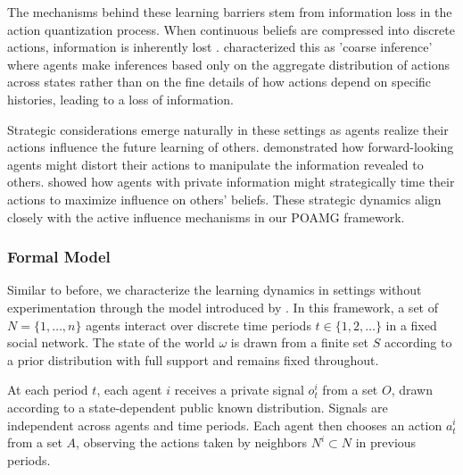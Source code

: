 \documentclass[a4paper,12pt]{report}
\begin{document}
The mechanisms behind these learning barriers stem from information loss in the action quantization process. When continuous beliefs are compressed into discrete actions, information is inherently lost \citep{smith2000pathological}. \citet{guarino2013social} characterized this as 'coarse inference' where agents make inferences based only on the aggregate distribution of actions across states rather than on the fine details of how actions depend on specific histories, leading to a loss of information.

\iffalse
    Recent work has examined how behavioral factors and network structure interact to shape learning outcomes. \citet{molavi2018theory} developed models of "rational inattention" where agents optimally allocate limited cognitive resources to process social information. \citet{dasaratha2020learning} showed how certain network structures can amplify or mitigate the effects of confirmation bias and other cognitive distortions. \citet{jadbabaie2012non} proposed hybrid learning models that combine Bayesian updating with naive opinion averaging, better matching empirical patterns of social influence.
\fi

Strategic considerations emerge naturally in these settings as agents realize their actions influence the future learning of others. \citet{bhattacharya2013strategic} demonstrated how forward-looking agents might distort their actions to manipulate the information revealed to others. \citet{ARIELI2019185} showed how agents with private information might strategically time their actions to maximize influence on others' beliefs. These strategic dynamics align closely with the active influence mechanisms in our POAMG framework.

\subsubsection{Formal Model}
Similar to before, we characterize the learning dynamics in settings without experimentation through the model introduced by \citet{brandl2024}. In this framework, a set of $N= \{1, \ldots, n\}$ agents interact over discrete time periods $t \in \{1, 2, \ldots\}$ in a fixed social network. The state of the world $\omega$ is drawn from a finite set $S$ according to a prior distribution with full support and remains fixed throughout.

At each period $t$, each agent $i$ receives a private signal $o^i_t$ from a set $O$, drawn according to a state-dependent public known distribution. Signals are independent across agents and time periods. Each agent then chooses an action $a^i_t$ from a set $A$, observing the actions taken by neighbors $N^i \subset N$ in previous periods.
\end{document}
